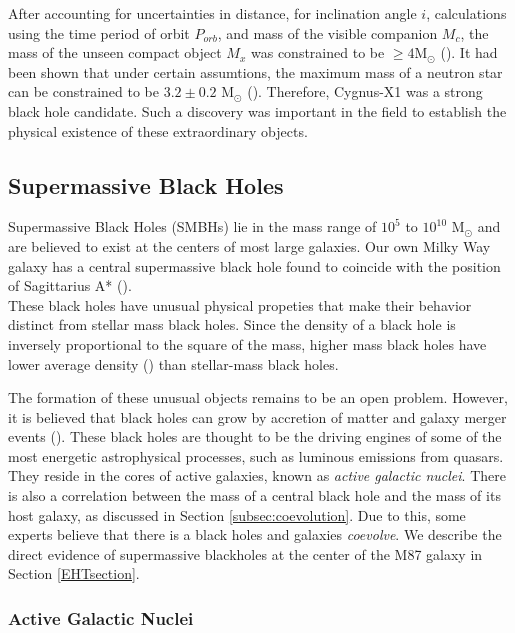 \documentclass[twocolumn]{aastex63}
\begin{document}
After accounting for uncertainties in distance, for inclination angle $i$, calculations using the time period of orbit $P_{orb}$, and mass of the visible companion $M_c$, the mass of the unseen compact object $M_x$ was constrained to be $\geq 4$M$_{\odot}$ (\cite{BoltonCYGX1}).   It had been shown that under certain assumtions, the maximum mass of a neutron star can be constrained to be $3.2\pm 0.2$ M$_{\odot}$ (\cite{Rhoades&Ruffini}). Therefore, Cygnus-X1 was a strong black hole candidate. Such a discovery was important in the field to establish the physical existence of these extraordinary objects.

\subsection{Supermassive Black Holes}
Supermassive Black Holes (SMBHs) lie in the mass range of $10^5$ to $10^{10}$ M$_\odot$ and are believed to exist at the centers of most large galaxies. Our own Milky Way galaxy has a central supermassive black hole found to coincide with the position of Sagittarius A* (\cite{Ghez1998ApJ...509..678G}).\\

These black holes have unusual physical propeties that make their behavior distinct from stellar mass black holes. Since the density of a black hole is inversely proportional to the square of the mass, higher mass black holes have lower average density (\cite{2015eiub.book.....B}) than stellar-mass black holes.

The formation of these unusual objects remains to be an open problem. However, it is believed that black holes can grow by accretion of matter and galaxy merger events (\cite{2015ApJ...799..178K}). These black holes are thought to be the driving engines of some of the most energetic astrophysical processes, such as luminous emissions from quasars. They reside in the cores of active galaxies, known as \textit{active galactic nuclei}. There is also a correlation between the mass of a central black hole and the mass of its host galaxy, as discussed in Section \ref{subsec:coevolution}. Due to this, some experts believe that there is a black holes and galaxies \textit{coevolve}. We describe the direct evidence of supermassive blackholes at the center of the M87 galaxy in Section \ref{EHTsection}.\\

\subsubsection{Active Galactic Nuclei}
\end{document}
